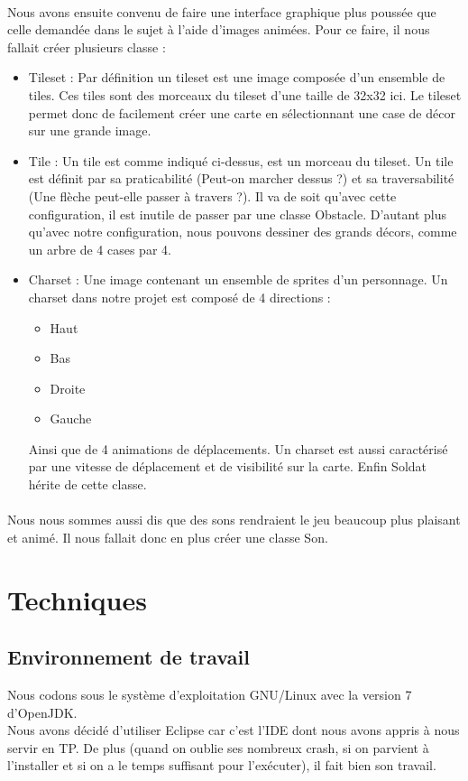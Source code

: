 \documentclass{article}
\begin{document}
\paragraph{}
Nous avons ensuite convenu de faire une interface graphique plus poussée que celle demandée dans le sujet à l'aide d'images animées.
Pour ce faire, il nous fallait créer plusieurs classe :
\begin{itemize}
 \item Tileset : Par définition un tileset est une image composée d'un ensemble de tiles. Ces tiles sont des morceaux du tileset d'une taille de 32x32 ici. Le tileset permet donc de facilement créer une carte en sélectionnant une case de décor sur une grande image.
 \item Tile : Un tile est comme indiqué ci-dessus, est un morceau du tileset. Un tile est définit par sa praticabilité (Peut-on marcher dessus ?) et sa traversabilité (Une flèche peut-elle passer à travers ?). Il va de soit qu'avec cette configuration, il est inutile de passer par une classe Obstacle. D'autant plus qu'avec notre configuration, nous pouvons dessiner des grands décors, comme un arbre de 4 cases par 4.
 \item Charset : Une image contenant un ensemble de sprites d'un personnage. Un charset dans notre projet est composé de 4 directions :
   \begin{itemize}
     \item Haut
     \item Bas
     \item Droite
     \item Gauche
   \end{itemize}
   Ainsi que de 4 animations de déplacements. Un charset est aussi caractérisé par une vitesse de déplacement et de visibilité sur la carte. Enfin Soldat hérite de cette classe.
\end{itemize}

\paragraph{}
Nous nous sommes aussi dis que des sons rendraient le jeu beaucoup plus plaisant et animé. Il nous fallait donc en plus créer une classe Son.


\section{Techniques}
  \subsection{Environnement de travail}
  Nous codons sous le système d'exploitation GNU/Linux avec la version 7 d'OpenJDK. \\
  Nous avons décidé d'utiliser Eclipse car c'est l'IDE dont nous avons appris à nous servir en TP.
  De plus (quand on oublie ses nombreux crash, si on parvient à l'installer et si on a le temps suffisant pour l'exécuter), il fait bien son travail.
  
\end{document}
